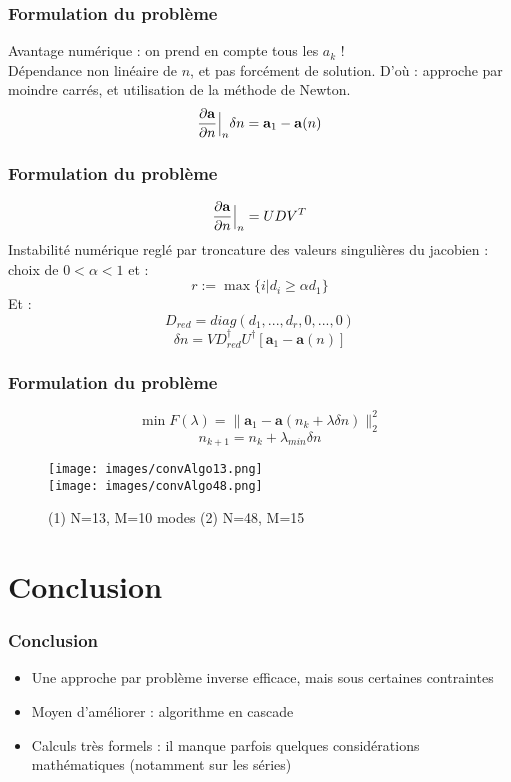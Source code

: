 \documentclass[handout, aspectratio=169]{beamer}
\def\restriction#1#2{\mathchoice
              {\setbox1\hbox{${\displaystyle #1}_{\scriptstyle #2}$}
              \restrictionaux{#1}{#2}}
              {\setbox1\hbox{${\textstyle #1}_{\scriptstyle #2}$}
              \restrictionaux{#1}{#2}}
              {\setbox1\hbox{${\scriptstyle #1}_{\scriptscriptstyle #2}$}
              \restrictionaux{#1}{#2}}
              {\setbox1\hbox{${\scriptscriptstyle #1}_{\scriptscriptstyle #2}$}
              \restrictionaux{#1}{#2}}}
\def\restrictionaux#1#2{{#1\,\smash{\vrule height .8\ht1 depth .85\dp1}}_{\,#2}}
\begin{document}
\begin{frame}
	\frametitle{Formulation du problème}
Avantage numérique : on prend en compte tous les $a_k$ !\\
Dépendance non linéaire de $n$, et pas forcément de solution. D'où : approche par moindre carrés, et utilisation de la méthode de Newton.
\begin{equation}\label{eq24}
	\restriction{\frac{\partial\mathbf{a}}{\partial n}}{n}\delta n=\mathbf{a}_1-\mathbf{a}(n)
\end{equation}
\end{frame}

\begin{frame}
	\frametitle{Formulation du problème}
	\[\restriction{\frac{\partial\mathbf{a}}{\partial n}}{n}=UDV^T\]
Instabilité numérique reglé par troncature des valeurs singulières du jacobien : choix de $0<\alpha<1$ et :
	\[r:=\max\{i | d_i\geq \alpha d_1\}\]
Et :
	\[D_{red}=diag(d_1,...,d_r,0,...,0)\]
\begin{equation}\label{eq26}
	\delta n=VD_{red}^\dagger U^\dagger [\mathbf{a}_1-\mathbf{a}(n)]
\end{equation}
\end{frame}

\begin{frame}
	\frametitle{Formulation du problème}
	\[\min F(\lambda)=\|\mathbf{a}_1-\mathbf{a}(n_k+\lambda\delta n)\|_2^2\]
	\[n_{k+1}=n_k+\lambda_{min}\delta n\]
\begin{figure}[!h]
	\centering
	\texttt{[image: images/convAlgo13.png]}\\
	\texttt{[image: images/convAlgo48.png]}
	\caption{(1) N=13, M=10 modes (2) N=48, M=15}
	\label{fig:accConv}
\end{figure}
\end{frame}

\section*{Conclusion}
\begin{frame}
	\frametitle{Conclusion}
\begin{itemize}
	\item Une approche par problème inverse efficace, mais sous certaines contraintes
	\item Moyen d'améliorer : algorithme en cascade
	\item Calculs très formels : il manque parfois quelques considérations mathématiques (notamment sur les séries)
\end{itemize}
\end{frame}
\end{document}
